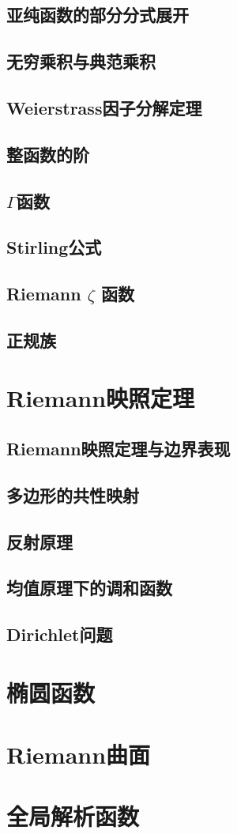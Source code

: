 \documentclass[UTF8]{ctexart}
\begin{document}
\subsection{亚纯函数的部分分式展开}
\subsection{无穷乘积与典范乘积}
\subsection{Weierstrass因子分解定理}
\subsection{整函数的阶}
\subsection{$\Gamma$函数}
\subsection{Stirling公式}
\subsection{Riemann $\zeta$ 函数}
\subsection{正规族}
\section{Riemann映照定理}
\subsection{Riemann映照定理与边界表现}
\subsection{多边形的共性映射}
\subsection{反射原理}
\subsection{均值原理下的调和函数}
\subsection{Dirichlet问题}
\section{椭圆函数}
\section{Riemann曲面}
\section{全局解析函数}
\end{document}
